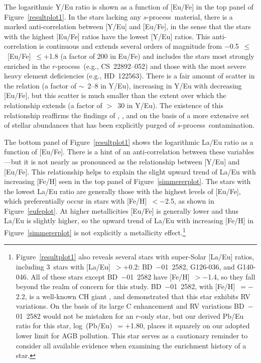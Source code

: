 \documentclass{emulateapj}
\def\rpro{\mbox{$r$-process}}
\def\spro{\mbox{$s$-process}}
\begin{document}
The logarithmic Y/Eu ratio is shown as a function of [Eu/Fe] 
in the top panel of Figure~\ref{resultplot1}.
In the stars lacking any \spro\ material,
there is a marked anti-correlation between [Y/Eu] and [Eu/Fe],
in the sense that the stars with the highest [Eu/Fe] ratios have the
lowest [Y/Eu] ratios.
This anti-correlation is continuous and 
extends several orders of magnitude from
$-$0.5~$\leq$~[Eu/Fe]~$\leq +$1.8 (a factor of 200 in Eu/Fe)
and includes the stars most strongly enriched in the \rpro\ 
(e.g., \mbox{CS~22892--052}) and those with the most
severe heavy element deficiencies (e.g., \mbox{HD~122563}).
There is a fair amount of scatter in the relation
(a factor of $\sim$~2--8 in Y/Eu), increasing
in Y/Eu with decreasing [Eu/Fe],
but this scatter is much smaller than the extent over which the
relationship extends (a factor of $>$~30 in Y/Eu).
The existence of this relationship
reaffirms the findings of \citet{barklem05}, \citet{otsuki06},
and \citet{montes07}
on the basis of a more extensive set of stellar abundances
that has been explicitly purged of \spro\ contamination.

The bottom panel of Figure~\ref{resultplot1} shows the logarithmic La/Eu 
ratio as a function of [Eu/Fe].
There is a hint of an anti-correlation between these variables---but 
it is not nearly as pronounced as the relationship between 
[Y/Eu] and [Eu/Fe].
This relationship helps to explain the slight
upward trend of La/Eu with increasing [Fe/H] 
seen in the top panel of Figure~\ref{simmererplot}.
The stars with the lowest La/Eu ratio are generally those with
the highest levels of [Eu/Fe], which preferentially occur
in stars with [Fe/H]~$< -$2.5, as shown in Figure~\ref{eufeplot}.
At higher metallicities [Eu/Fe] is generally lower and thus
La/Eu is slightly higher, so the upward trend of 
La/Eu with increasing [Fe/H] in Figure~\ref{simmererplot} is
not explicitly a metallicity effect.\footnote{
Figure~\ref{resultplot1} also reveals several stars with super-Solar
[La/Eu] ratios, including 3~stars with [La/Eu]~$> +0.2$:
\mbox{BD~$-$01~2582}, \mbox{G126-036}, and \mbox{G140-046}.
All of these stars except \mbox{BD~$-$01~2582} have 
[Fe/H]~$> -$1.4, so they fall beyond
the realm of concern for this study.
\mbox{BD~$-$01~2582}, with [Fe/H]~$= -$2.2, 
is a well-known CH giant \citep{bond80}, and
\citet{carney03} demonstrated that this star exhibits RV variations.
On the basis of its large C enhancement and RV variations
\mbox{BD~$-$01~2582} would not be mistaken for an
$r$-only star, but our derived Pb/Eu ratio for this star,
log~(Pb/Eu)~$= +$1.80, places it squarely on our adopted lower
limit for AGB pollution.
This star serves as a cautionary reminder to consider 
all available evidence when examining the enrichment history of a star.}
\end{document}
